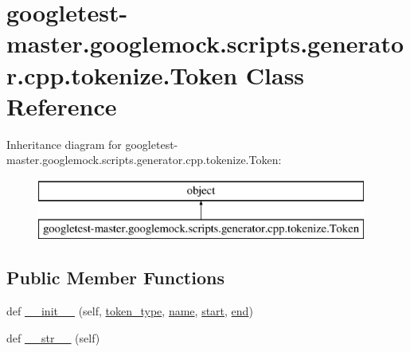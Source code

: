 \hypertarget{classgoogletest-master_1_1googlemock_1_1scripts_1_1generator_1_1cpp_1_1tokenize_1_1_token}{}\section{googletest-\/master.googlemock.\+scripts.\+generator.\+cpp.\+tokenize.\+Token Class Reference}
\label{classgoogletest-master_1_1googlemock_1_1scripts_1_1generator_1_1cpp_1_1tokenize_1_1_token}
Inheritance diagram for googletest-\/master.googlemock.\+scripts.\+generator.\+cpp.\+tokenize.\+Token\+:\begin{figure}[H]
\begin{center}
\leavevmode
\includegraphics[height=2.000000cm]{d4/d3b/classgoogletest-master_1_1googlemock_1_1scripts_1_1generator_1_1cpp_1_1tokenize_1_1_token}
\end{center}
\end{figure}
\subsection*{Public Member Functions}
\begin{DoxyCompactItemize}
\item 
def \mbox{\hyperlink{classgoogletest-master_1_1googlemock_1_1scripts_1_1generator_1_1cpp_1_1tokenize_1_1_token_ac9da61662959b7f9a8e24e7a26d894a3}{\+\_\+\+\_\+init\+\_\+\+\_\+}} (self, \mbox{\hyperlink{classgoogletest-master_1_1googlemock_1_1scripts_1_1generator_1_1cpp_1_1tokenize_1_1_token_aab2d509ec2280d2e77cf354d375272be}{token\+\_\+type}}, \mbox{\hyperlink{classgoogletest-master_1_1googlemock_1_1scripts_1_1generator_1_1cpp_1_1tokenize_1_1_token_acf52f80edc551beb42cf476313c12fef}{name}}, \mbox{\hyperlink{classgoogletest-master_1_1googlemock_1_1scripts_1_1generator_1_1cpp_1_1tokenize_1_1_token_a56daf1bfd640aa7d5ce7ba73cdf90925}{start}}, \mbox{\hyperlink{classgoogletest-master_1_1googlemock_1_1scripts_1_1generator_1_1cpp_1_1tokenize_1_1_token_a4d23764af29783fd740dc4aa642cab31}{end}})
\item 
def \mbox{\hyperlink{classgoogletest-master_1_1googlemock_1_1scripts_1_1generator_1_1cpp_1_1tokenize_1_1_token_aef6cf5cd9aec802259309c4733093d02}{\+\_\+\+\_\+str\+\_\+\+\_\+}} (self)
\end{DoxyCompactItemize}
